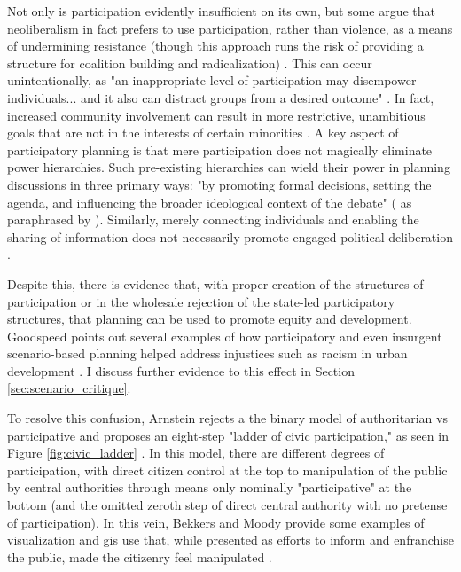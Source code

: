 Not only is participation evidently insufficient on its own, but some argue that neoliberalism in fact prefers to use participation, rather than violence, as a means of undermining resistance (though this approach runs the risk of providing a structure for coalition building and radicalization) \cite{miraftabInsurgentPlanningSituating2016}. This can occur unintentionally, as "an inappropriate level of participation may disempower individuals... and it also can distract groups from a desired outcome" \cite{sieberPublicParticipationGeographic2006}. In fact, increased community involvement can result in more restrictive, unambitious goals that are not in the interests of certain minorities \cite{wheatonIdentifyingPublicInterest1972}. A key aspect of participatory planning is that mere participation does not magically eliminate power hierarchies. Such pre-existing hierarchies can wield their power in planning discussions in 
three primary ways: "by promoting formal decisions, setting the agenda, and influencing the broader ideological context of the debate" (\cite{foresterPlanningFacePower2001} as paraphrased by \cite{goodspeedScenarioPlanningCities2020}). Similarly, merely connecting individuals and enabling the sharing of information does not necessarily promote engaged political deliberation \cite{gordonAugmentedDeliberationMerging2011}.

Despite this, there is evidence that, with proper creation of the structures of participation or in the wholesale rejection of the state-led participatory structures, that planning can be used to promote equity and development. Goodspeed points out several examples of how participatory and even insurgent scenario-based planning helped address injustices such as racism in urban development \cite{goodspeedScenarioPlanningCities2020}. I discuss further evidence to this effect in Section \ref{sec:scenario_critique}.

To resolve this confusion, Arnstein rejects a the binary model of authoritarian vs participative and proposes an eight-step "ladder of civic participation," as seen in Figure \ref{fig:civic_ladder} \cite{arnsteinLadderCitizenParticipation1969}. In this model, there are different degrees of participation, with direct citizen control at the top to manipulation of the public by central authorities through means only nominally "participative" at the bottom (and the omitted zeroth step of direct central authority with no pretense of participation). In this vein, Bekkers and Moody provide some examples of visualization and \ac{gis} use that, while presented as efforts to inform and enfranchise the public, made the citizenry feel manipulated \cite{bekkersVisualEventsElectronic2011}. 

